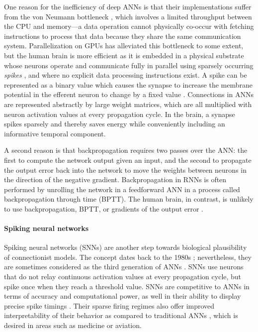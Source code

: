 One reason for the inefficiency of deep ANNs is that their implementations suffer from the von Neumann bottleneck \citep{zenke2021brain}, which involves a limited throughput between the CPU and memory---a data operation cannot physically co-occur with fetching instructions to process that data because they share the same communication system.
Parallelization on GPUs has alleviated this bottleneck to some extent, but the human brain is more efficient as it is embedded in a physical substrate whose neurons operate and communicate fully in parallel \citep{a2017parallel} using sparsely occurring \emph{spikes} \citep{bear2020neuroscience}, and where no explicit data processing instructions exist.
A spike can be represented as a binary value which causes the synapse to increase the membrane potential in the efferent neuron to change by a fixed value \citep{bear2020neuroscience}.
Connections in ANNs are represented abstractly by large weight matrices, which are all multiplied with neuron activation values at every propagation cycle.
In the brain, a synapse spikes sparsely and thereby saves energy while conveniently including an informative temporal component.

A second reason is that backpropagation requires two passes over the ANN: the first to compute the network output given an input, and the second to propagate the output error back into the network to move the weights between neurons in the direction of the negative gradient.
Backpropagation in RNNs is often performed by unrolling the network in a feedforward ANN in a process called backpropagation through time (BPTT).
The human brain, in contrast, is unlikely to use backpropagation, BPTT, or gradients of the output error \citep{lillicrap2019backpropagation}.

\paragraph{Spiking neural networks}
Spiking neural networks (SNNs) \citep{maass1997networks,gerstner2002spiking} are another step towards biological plausibility of connectionist models.
The concept dates back to the 1980s \citep{hopfield1982neural}; nevertheless, they are sometimes considered as the third generation of ANNs \citep{maass1997networks}.
SNNs use neurons that do not relay continuous activation values at every propagation cycle, but spike once when they reach a threshold value.
SNNs are competitive to ANNs in terms of accuracy and computational power, as well in their ability to display precise spike timings \citep{lobo2020spiking}.
Their sparse firing regimes also offer improved interpretability of their behavior as compared to traditional ANNs \citep{soltic2010knowledge}, which is desired in areas such as medicine or aviation.

